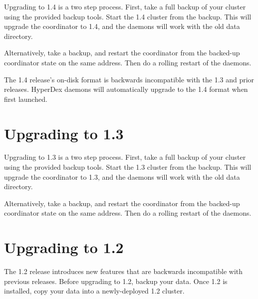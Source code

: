 Upgrading to 1.4 is a two step process.  First, take a full backup of your
cluster using the provided backup tools.  Start the 1.4 cluster from the
backup.  This will upgrade the coordinator to 1.4, and the daemons will work
with the old data directory.

Alternatively, take a backup, and restart the coordinator from the backed-up
coordinator state on the same address.  Then do a rolling restart of the
daemons.

The 1.4 release's on-disk format is backwards incompatible with the 1.3 and
prior releases.  HyperDex daemons will automatically upgrade to the 1.4 format
when first launched.

\section{Upgrading to 1.3}
\label{sec:installation:upgrade1.3}

Upgrading to 1.3 is a two step process.  First, take a full backup of your
cluster using the provided backup tools.  Start the 1.3 cluster from the
backup.  This will upgrade the coordinator to 1.3, and the daemons will work
with the old data directory.

Alternatively, take a backup, and restart the coordinator from the backed-up
coordinator state on the same address.  Then do a rolling restart of the
daemons.

\section{Upgrading to 1.2}
\label{sec:installation:upgrade1.2}

The 1.2 release introduces new features that are backwards incompatible with
previous releases.  Before upgrading to 1.2, backup your data.  Once 1.2 is
installed, copy your data into a newly-deployed 1.2 cluster.
